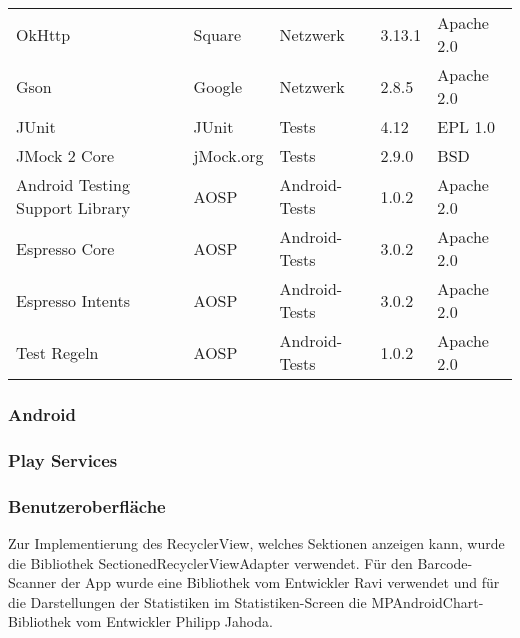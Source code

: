 \begin{tabularx}{\textwidth}{|X|l|l|l|l|}
    OkHttp & Square & Netzwerk & 3.13.1 & Apache 2.0\\   %
    Gson & Google & Netzwerk & 2.8.5 & Apache 2.0\\   %
    \hline

    JUnit & JUnit & Tests & 4.12 & EPL 1.0\\   %
    JMock 2 Core & jMock.org & Tests & 2.9.0 & BSD\\    %
    \hline

    Android Testing Support Library & AOSP & Android-Tests & 1.0.2 & Apache 2.0\\   %
    Espresso Core & AOSP & Android-Tests & 3.0.2 & Apache 2.0\\    %
    Espresso Intents & AOSP & Android-Tests & 3.0.2 & Apache 2.0\\ %
    Test Regeln & AOSP & Android-Tests & 1.0.2 & Apache 2.0\\  %
    \hline
\end{tabularx}

\subsubsection{Android} \label{subsubsec:android-libraries}

\subsubsection{Play Services} \label{subsubsec:play-service-libraries}

\subsubsection{Benutzeroberfläche} \label{subsubsec:ui-libraries}
Zur Implementierung des RecyclerView, welches Sektionen anzeigen kann, wurde die Bibliothek SectionedRecyclerViewAdapter verwendet.
Für den Barcode-Scanner der App wurde eine Bibliothek vom Entwickler Ravi verwendet und für die Darstellungen der Statistiken im Statistiken-Screen die MPAndroidChart-Bibliothek vom Entwickler Philipp Jahoda.

